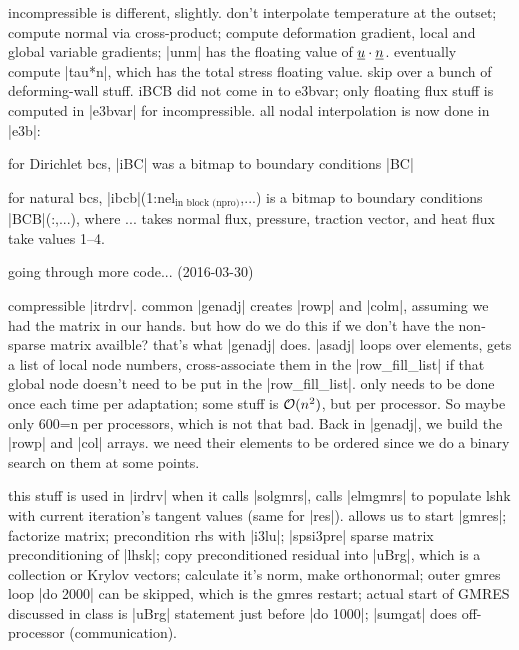 \documentclass[11pt]{article}
\begin{document}
incompressible is different, slightly. don't interpolate temperature at the outset; compute normal via cross-product; compute deformation gradient, local and global variable gradients; |unm| has the floating value of $\underline{u} \cdot \underline{n}$. eventually compute |tau*n|, which has the total stress floating value. skip over a bunch of deforming-wall stuff. iBCB did not come in to e3bvar; only floating flux stuff is computed in |e3bvar| for incompressible. all nodal interpolation is now done in |e3b|:

for Dirichlet bcs, |iBC| was a bitmap to boundary conditions |BC|

for natural bcs, |ibcb|(1:nel$_\text{in block (npro)}$,...) is a bitmap to boundary conditions |BCB|(:,...), where ... takes normal flux, pressure, traction vector, and heat flux take values 1--4.

going through more code... (2016-03-30)

compressible |itrdrv|. common |genadj| creates |rowp| and |colm|, assuming we had the matrix in our hands. but how do we do this if we don't have the non-sparse matrix availble? that's what |genadj| does. |asadj| loops over elements, gets a list of local node numbers, cross-associate them in the |row_fill_list| if that global node doesn't need to be put in the |row_fill_list|. only needs to be done once each time per adaptation; some stuff is $\mathcal{O}(n^2)$, but per processor. So maybe only 600=n per processors, which is not that bad. Back in |genadj|, we build the |rowp| and |col| arrays. we need their elements to be ordered since we do a binary search on them at some points.

this stuff is used in |irdrv| when it calls |solgmrs|, calls |elmgmrs| to populate lshk with current iteration's tangent values (same for |res|). allows us to start |gmres|; factorize matrix; precondition rhs with |i3lu|; |spsi3pre| sparse matrix preconditioning of |lhsk|; copy preconditioned residual into |uBrg|, which is a collection or Krylov vectors; calculate it's norm, make orthonormal; outer gmres loop |do 2000| can be skipped, which is the gmres restart; actual start of GMRES discussed in class is |uBrg| statement just before |do 1000|; |sumgat| does off-processor (communication).
\end{document}
